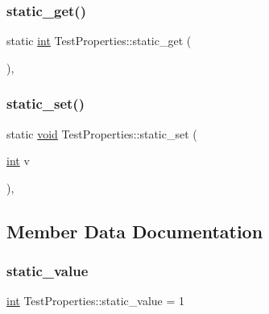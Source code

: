 \mbox{\label{struct_test_properties_a2704165e145e02a8f4df12deae7ec347}} 
\subsubsection{\texorpdfstring{static\_get()}{static\_get()}}
{\footnotesize\ttfamily static \mbox{\hyperlink{warnings_8h_a74f207b5aa4ba51c3a2ad59b219a423b}{int}} Test\+Properties\+::static\+\_\+get (\begin{DoxyParamCaption}{ }\end{DoxyParamCaption})\hspace{0.3cm}{\ttfamily [inline]}, {\ttfamily [static]}}

\mbox{\label{struct_test_properties_a023fbce09cdfc80a93493a52d295ad81}} 
\subsubsection{\texorpdfstring{static\_set()}{static\_set()}}
{\footnotesize\ttfamily static \mbox{\hyperlink{_s_d_l__opengles2__gl2ext_8h_ae5d8fa23ad07c48bb609509eae494c95}{void}} Test\+Properties\+::static\+\_\+set (\begin{DoxyParamCaption}\item[{\mbox{\hyperlink{warnings_8h_a74f207b5aa4ba51c3a2ad59b219a423b}{int}}}]{v }\end{DoxyParamCaption})\hspace{0.3cm}{\ttfamily [inline]}, {\ttfamily [static]}}



\subsection{Member Data Documentation}
\mbox{\label{struct_test_properties_ac583c9f9eaa6cc08aea56c6113248d59}} 
\subsubsection{\texorpdfstring{static\_value}{static\_value}}
{\footnotesize\ttfamily \mbox{\hyperlink{warnings_8h_a74f207b5aa4ba51c3a2ad59b219a423b}{int}} Test\+Properties\+::static\+\_\+value = 1\hspace{0.3cm}{\ttfamily [static]}}

